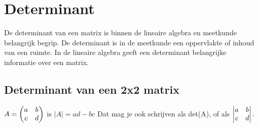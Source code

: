 \chapter{Determinant}
\label{chap: Determinant}
De determinant van een matrix is binnen de lineaire algebra en meetkunde belangrijk begrip. De determinant is in de meetkunde een oppervlakte of inhoud van een ruimte. In de lineaire algebra geeft een determinant belangrijke informatie over een matrix.
\section{Determinant van een 2x2 matrix}
{ $ A = \begin{pmatrix} a & b \\ c & d \end{pmatrix} $ 
	\quad is \quad $ |A| = ad - bc $ }
Dat mag je ook schrijven als \quad det(A), \quad of als 
\quad $  \begin{vmatrix} a & b \\ c & d \end{vmatrix}.  $ \\ \\
